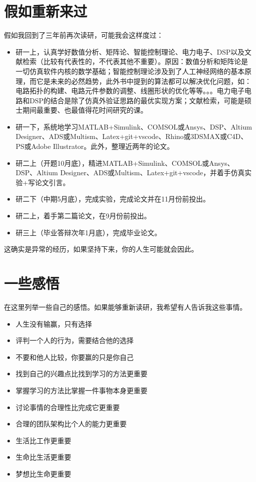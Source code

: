 \documentclass[UTF8,oneside]{ctexbook}
\begin{document}
\section{假如重新来过}
假如我回到了三年前再次读研，可能我会这样度过：
\begin{itemize}
	\item 研一上，认真学好数值分析、矩阵论、智能控制理论、电力电子、DSP以及文献检索（比较有代表性的，不代表其他不重要）。原因：数值分析和矩阵论是一切仿真软件内核的数学基础；智能控制理论涉及到了人工神经网络的基本原理，而它是未来的必然趋势，此外书中提到的算法都可以解决优化问题，如：电路拓扑的构建、电路元件参数的调整、线圈形状的优化等等。。。电力电子电路和DSP的结合是除了仿真外验证思路的最优实现方案；文献检索，可能是硕士期间最重要、也最值得花时间研究的课。
	\item 研一下，系统地学习MATLAB+Simulink、COMSOL或Ansys、DSP、Altium Designer、ADS或Multism、Latex+git+vscode、Rhino或3DSMAX或C4D、PS或Adobe Illustrator。此外，整理近两年的论文。
	\item 研二上（开题10月底），精进MATLAB+Simulink、COMSOL或Ansys、DSP、Altium Designer、ADS或Multism、Latex+git+vscode，并着手仿真实验+写论文引言。
	\item 研二下（中期5月底），完成实验，完成论文并在11月份前投出。
	\item 研二上，着手第二篇论文，在9月份前投出。
	\item 研三上（毕业答辩次年1月底），完成毕业论文。
\end{itemize}

这确实是异常的经历，如果坚持下来，你的人生可能就会因此。

\section{一些感悟}
在这里列举一些自己的感悟。如果能够重新读研，我希望有人告诉我这些事情。
\begin{itemize}
	\item 人生没有输赢，只有选择
	\item 评判一个人的行为，需要结合他的选择
	\item 不要和他人比较，你要赢的只是你自己
	\item 找到自己的兴趣点比找到学习的方法更重要
	\item 掌握学习的方法比掌握一件事物本身更重要
	\item 讨论事情的合理性比完成它更重要
	\item 合理的团队架构比个人的能力更重要
	\item 生活比工作更重要
	\item 生命比生活更重要
	\item 梦想比生命更重要
\end{itemize}
\end{document}
